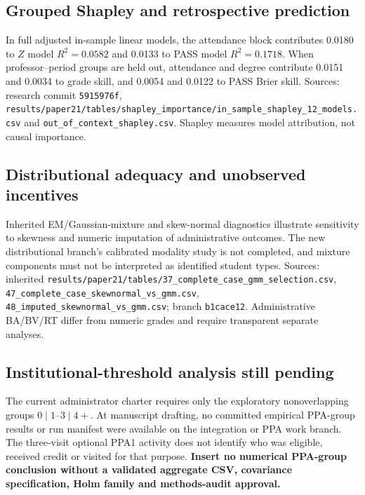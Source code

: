 \subsection{Grouped Shapley and retrospective prediction}
In full adjusted in-sample linear models, the attendance block contributes 0.0180 to $Z$ model $R^2=0.0582$ and 0.0133 to PASS model $R^2=0.1718$. When professor--period groups are held out, attendance and degree contribute 0.0151 and 0.0034 to grade skill, and 0.0054 and 0.0122 to PASS Brier skill. Sources: research commit \texttt{5915976f}, \texttt{results/paper21/tables/shapley\_importance/in\_sample\_shapley\_12\_models.csv} and \texttt{out\_of\_context\_shapley.csv}. Shapley measures model attribution, not causal importance.

\subsection{Distributional adequacy and unobserved incentives}
Inherited EM/Gaussian-mixture and skew-normal diagnostics illustrate sensitivity to skewness and numeric imputation of administrative outcomes. The new distributional branch's calibrated modality study is not completed, and mixture components must not be interpreted as identified student types. Sources: inherited \texttt{results/paper21/tables/37\_complete\_case\_gmm\_selection.csv}, \texttt{47\_complete\_case\_skewnormal\_vs\_gmm.csv}, \texttt{48\_imputed\_skewnormal\_vs\_gmm.csv}; branch \texttt{b1cace12}. Administrative BA/BV/RT differ from numeric grades and require transparent separate analyses.

\subsection{Institutional-threshold analysis still pending}
The current administrator charter requires only the exploratory nonoverlapping groups $0\mid1$--$3\mid4+$. At manuscript drafting, no committed empirical PPA-group results or run manifest were available on the integration or PPA work branch. The three-visit optional PPA1 activity does not identify who was eligible, received credit or visited for that purpose. \textbf{Insert no numerical PPA-group conclusion without a validated aggregate CSV, covariance specification, Holm family and methods-audit approval.}
